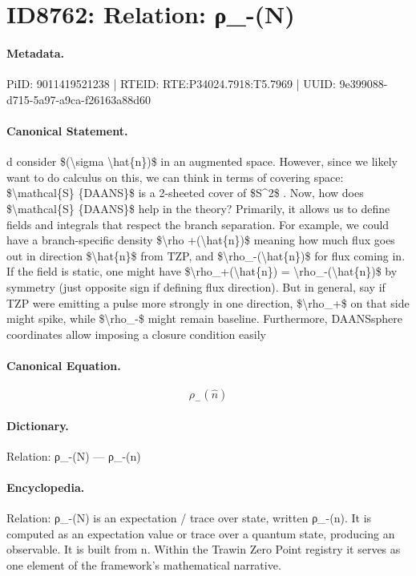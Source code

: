 \section*{ID8762: Relation: ρ\_-(N)}
\paragraph{Metadata.}
PiID: 9011419521238 | RTEID: RTE:P34024.7918:T5.7969 | UUID: 9e399088-d715-5a97-a9ca-f26163a88d60

\paragraph{Canonical Statement.}
d consider \$(\textbackslash{}sigma \textbackslash{}hat\{n\})\$ in an augmented space. However, since we likely want to do calculus on this, we can think in terms of covering space: \$\textbackslash{}mathcal\{S\} \{DAANS\}\$ is a 2-sheeted cover of \$S\textasciicircum{}2\$ . Now, how does \$\textbackslash{}mathcal\{S\} \{DAANS\}\$ help in the theory? Primarily, it allows us to define fields and integrals that respect the branch separation. For example, we could have a branch-specific density \$\textbackslash{}rho +(\textbackslash{}hat\{n\})\$ meaning how much flux goes out in direction \$\textbackslash{}hat\{n\}\$ from TZP, and \$\textbackslash{}rho\_-(\textbackslash{}hat\{n\})\$ for flux coming in. If the field is static, one might have \$\textbackslash{}rho\_+(\textbackslash{}hat\{n\}) = \textbackslash{}rho\_-(\textbackslash{}hat\{n\})\$ by symmetry (just opposite sign if defining flux direction). But in general, say if TZP were emitting a pulse more strongly in one direction, \$\textbackslash{}rho\_+\$ on that side might spike, while \$\textbackslash{}rho\_-\$ might remain baseline. Furthermore, DAANSsphere coordinates allow imposing a closure condition easily

\paragraph{Canonical Equation.}
\[
\rho_-(\hat{n})
\]

\paragraph{Dictionary.}
Relation: ρ\_-(N) — ρ\_-(n)

\paragraph{Encyclopedia.}
Relation: ρ\_-(N) is an expectation / trace over state, written ρ\_-(n). It is computed as an expectation value or trace over a quantum state, producing an observable. It is built from n. Within the Trawin Zero Point registry it serves as one element of the framework's mathematical narrative.
